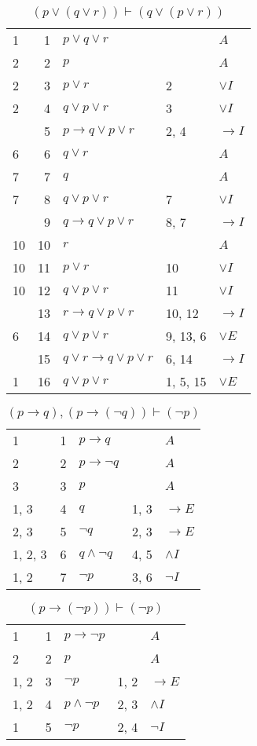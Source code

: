 \documentclass{article}
\begin{document}
\begin{table}[htbp]\caption*{$(p∨(q∨r)) ⊢ (q∨(p∨r))$}\centering\begin{tabular}{lrlll}
{1} & 1 & $p∨q∨r$ & {} & $A$ \\
{2} & 2 & $p$ & {} & $A$ \\
{2} & 3 & $p∨r$ & {2} & $∨I$ \\
{2} & 4 & $q∨p∨r$ & {3} & $∨I$ \\
{} & 5 & $p→q∨p∨r$ & {2, 4} & $→I$ \\
{6} & 6 & $q∨r$ & {} & $A$ \\
{7} & 7 & $q$ & {} & $A$ \\
{7} & 8 & $q∨p∨r$ & {7} & $∨I$ \\
{} & 9 & $q→q∨p∨r$ & {8, 7} & $→I$ \\
{10} & 10 & $r$ & {} & $A$ \\
{10} & 11 & $p∨r$ & {10} & $∨I$ \\
{10} & 12 & $q∨p∨r$ & {11} & $∨I$ \\
{} & 13 & $r→q∨p∨r$ & {10, 12} & $→I$ \\
{6} & 14 & $q∨p∨r$ & {9, 13, 6} & $∨E$ \\
{} & 15 & $q∨r→q∨p∨r$ & {6, 14} & $→I$ \\
{1} & 16 & $q∨p∨r$ & {1, 5, 15} & $∨E$ \\
\end{tabular}
\end{table}
\begin{table}[htbp]\caption*{$(p→q),(p→(¬q)) ⊢ (¬p)$}\centering\begin{tabular}{lrlll}
{1} & 1 & $p→q$ & {} & $A$ \\
{2} & 2 & $p→ ¬q$ & {} & $A$ \\
{3} & 3 & $p$ & {} & $A$ \\
{1, 3} & 4 & $q$ & {1, 3} & $→E$ \\
{2, 3} & 5 & $¬q$ & {2, 3} & $→E$ \\
{1, 2, 3} & 6 & $q∧ ¬q$ & {4, 5} & $∧I$ \\
{1, 2} & 7 & $¬p$ & {3, 6} & $¬I$ \\
\end{tabular}
\end{table}
\begin{table}[htbp]\caption*{$(p→(¬p)) ⊢ (¬p)$}\centering\begin{tabular}{lrlll}
{1} & 1 & $p→ ¬p$ & {} & $A$ \\
{2} & 2 & $p$ & {} & $A$ \\
{1, 2} & 3 & $¬p$ & {1, 2} & $→E$ \\
{1, 2} & 4 & $p∧ ¬p$ & {2, 3} & $∧I$ \\
{1} & 5 & $¬p$ & {2, 4} & $¬I$ \\
\end{tabular}
\end{table}
\end{document}
